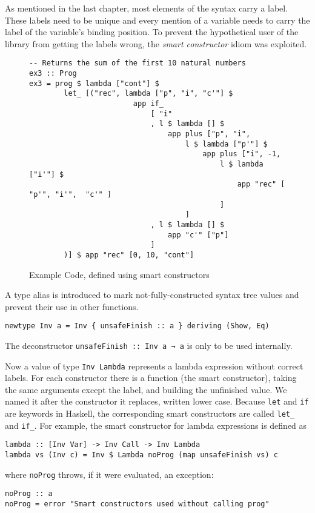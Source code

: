 \documentclass[a4paper,halfparskip,DIV=10,11pt]{scrbook}
\begin{document}
As mentioned in the last chapter, most elements of the syntax carry a label. These labels need to be unique and every mention of a variable needs to carry the label of the variable’s binding position. To prevent the hypothetical user of the library from getting the labels wrong, the \textit{smart constructor} idiom was exploited.

\begin{figure}
\begin{framed}
\centering
\begin{lstlisting}
-- Returns the sum of the first 10 natural numbers            
ex3 :: Prog
ex3 = prog $ lambda ["cont"] $
        let_ [("rec", lambda ["p", "i", "c'"] $
                        app if_
                            [ "i"
                            , l $ lambda [] $
                                app plus ["p", "i",
                                    l $ lambda ["p'"] $
                                        app plus ["i", -1,
                                            l $ lambda ["i'"] $
                                                app "rec" [ "p'", "i'",  "c'" ]
                                            ]
                                    ]
                            , l $ lambda [] $
                                app "c'" ["p"]
                            ]
        )] $ app "rec" [0, 10, "cont"]
\end{lstlisting}
\end{framed}
\caption{Example Code, defined using smart constructors}
\label{fig:sum10}
\end{figure}

A type alias is introduced to mark not-fully-constructed syntax tree values and prevent their use in other functions.
\begin{lstlisting}
newtype Inv a = Inv { unsafeFinish :: a } deriving (Show, Eq)
\end{lstlisting}
The deconstructor \lstinline!unsafeFinish :: Inv a → a! is only to be used internally.

Now a value of type \lstinline-Inv Lambda- represents a lambda expression without correct labels. For each constructor there is a function (the smart constructor), taking the same arguments except the label, and building the unfinished value. We named it after the constructor it replaces, written lower case. Because \lstinline-let- and \lstinline-if- are keywords in Haskell, the corresponding smart constructors are called \lstinline-let_- and \lstinline-if_-. For example, the smart constructor for lambda expressions is defined as
\begin{lstlisting}
lambda :: [Inv Var] -> Inv Call -> Inv Lambda
lambda vs (Inv c) = Inv $ Lambda noProg (map unsafeFinish vs) c
\end{lstlisting}
where \lstinline!noProg! throws, if it were evaluated, an exception:
\begin{lstlisting}
noProg :: a
noProg = error "Smart constructors used without calling prog"
\end{lstlisting}
\end{document}
